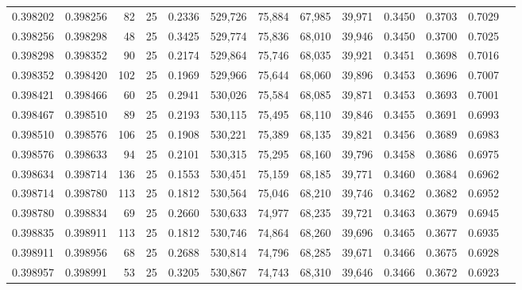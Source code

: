 \begin{tabular}{rrrrrrrrrrrrr}
0.398202 & 0.398256 &    82 &  25 &                                     0.2336 & 529,726 &  75,884 &  67,985 &  39,971 & 0.3450 & 0.3703 & 0.7029 \\
0.398256 & 0.398298 &    48 &  25 &                                     0.3425 & 529,774 &  75,836 &  68,010 &  39,946 & 0.3450 & 0.3700 & 0.7025 \\
0.398298 & 0.398352 &    90 &  25 &                                     0.2174 & 529,864 &  75,746 &  68,035 &  39,921 & 0.3451 & 0.3698 & 0.7016 \\
0.398352 & 0.398420 &   102 &  25 &                                     0.1969 & 529,966 &  75,644 &  68,060 &  39,896 & 0.3453 & 0.3696 & 0.7007 \\
0.398421 & 0.398466 &    60 &  25 &                                     0.2941 & 530,026 &  75,584 &  68,085 &  39,871 & 0.3453 & 0.3693 & 0.7001 \\
0.398467 & 0.398510 &    89 &  25 &                                     0.2193 & 530,115 &  75,495 &  68,110 &  39,846 & 0.3455 & 0.3691 & 0.6993 \\
0.398510 & 0.398576 &   106 &  25 &                                     0.1908 & 530,221 &  75,389 &  68,135 &  39,821 & 0.3456 & 0.3689 & 0.6983 \\
0.398576 & 0.398633 &    94 &  25 &                                     0.2101 & 530,315 &  75,295 &  68,160 &  39,796 & 0.3458 & 0.3686 & 0.6975 \\
0.398634 & 0.398714 &   136 &  25 &                                     0.1553 & 530,451 &  75,159 &  68,185 &  39,771 & 0.3460 & 0.3684 & 0.6962 \\
0.398714 & 0.398780 &   113 &  25 &                                     0.1812 & 530,564 &  75,046 &  68,210 &  39,746 & 0.3462 & 0.3682 & 0.6952 \\
0.398780 & 0.398834 &    69 &  25 &                                     0.2660 & 530,633 &  74,977 &  68,235 &  39,721 & 0.3463 & 0.3679 & 0.6945 \\
0.398835 & 0.398911 &   113 &  25 &                                     0.1812 & 530,746 &  74,864 &  68,260 &  39,696 & 0.3465 & 0.3677 & 0.6935 \\
0.398911 & 0.398956 &    68 &  25 &                                     0.2688 & 530,814 &  74,796 &  68,285 &  39,671 & 0.3466 & 0.3675 & 0.6928 \\
0.398957 & 0.398991 &    53 &  25 &                                     0.3205 & 530,867 &  74,743 &  68,310 &  39,646 & 0.3466 & 0.3672 & 0.6923 \\

\end{tabular}
